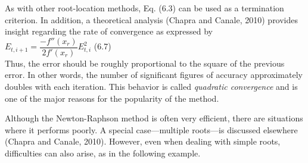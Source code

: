 \documentclass[../main.tex]{subfiles}
\begin{document}
As with other root-location methods, Eq. (6.3) can be used as a termination criterion.
In addition, a theoretical analysis (Chapra and Canale, 2010) provides insight regarding the
rate of convergence as expressed by\\

$E_{t,i+1} = \dfrac{-f''(x_r)}{2f'(x_r)}E^2_{t,i}$
\hfill (6.7)\\

\noindent Thus, the error should be roughly proportional to the square of the previous error. In other
words, the number of significant figures of accuracy approximately doubles with each
iteration. This behavior is called \emph{quadratic convergence} and is one of the major reasons for
the popularity of the method.

Although the Newton-Raphson method is often very efficient, there are situations
where it performs poorly. A special case---multiple roots---is discussed elsewhere (Chapra
and Canale, 2010). However, even when dealing with simple roots, difficulties can also
arise, as in the following example.\\
\end{document}
